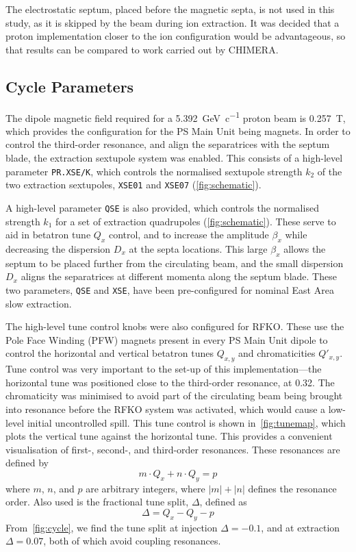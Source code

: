 \documentclass[a4paper,twoside,11pt]{report}
\begin{document}
The electrostatic septum, placed before the magnetic septa, is not used in this study, as it is skipped by the beam during ion extraction. It was decided that a proton implementation closer to the ion configuration would be advantageous, so that results can be compared to work carried out by CHIMERA.

\subsection{Cycle Parameters}\label{sec:magcycle}

The dipole magnetic field required for a \qty[per-mode=symbol]{5.392}{\giga\electronvolt\per~c} proton beam is \qty{0.257}{\tesla}, which provides the configuration for the PS Main Unit being magnets. In order to control the third-order resonance, and align the separatrices with the septum blade, the extraction sextupole system was enabled. This consists of a high-level parameter \verb|PR.XSE/K|, which controls the normalised sextupole strength $k_2$ of the two extraction sextupoles, \verb|XSE01| and \verb|XSE07| (\autoref{fig:schematic}). 

A high-level parameter \verb|QSE| is also provided, which controls the normalised strength $k_1$ for a set of extraction quadrupoles (\autoref{fig:schematic}). These serve to aid in betatron tune $Q_x$ control, and to increase the amplitude $\beta_x$ while decreasing the dispersion $D_x$ at the septa locations. This large $\beta_x$ allows the septum to be placed further from the circulating beam, and the small dispersion $D_x$ aligns the separatrices at different momenta along the septum blade. These two parameters, \verb|QSE| and \verb|XSE|, have been pre-configured for nominal East Area slow extraction.

The high-level tune control knobs were also configured for RFKO. These use the Pole Face Winding (PFW) magnets present in every PS Main Unit dipole to control the horizontal and vertical betatron tunes $Q_{x, y}$ and chromaticities $Q'_{x, y}$. Tune control was very important to the set-up of this implementation---the horizontal tune was positioned close to the third-order resonance, at 0.32. The chromaticity was minimised to avoid part of the circulating beam being brought into resonance before the RFKO system was activated, which would cause a low-level initial uncontrolled spill. This tune control is shown in~\autoref{fig:tunemap}, which plots the vertical tune against the horizontal tune. This provides a convenient visualisation of first-, second-, and third-order resonances. These resonances are defined by
\begin{equation}
  m\cdot Q_x+n\cdot Q_y=p
\end{equation} where $m$, $n$, and $p$ are arbitrary integers, where $|m|+|n|$ defines the resonance order. Also used is the fractional tune split, $\Delta$, defined as
\begin{equation}
  \Delta = Q_x-Q_y-p
\end{equation}
From~\autoref{fig:cycle}, we find the tune split at injection $\Delta=-0.1$, and at extraction $\Delta=0.07$, both of which avoid coupling resonances.
\end{document}
